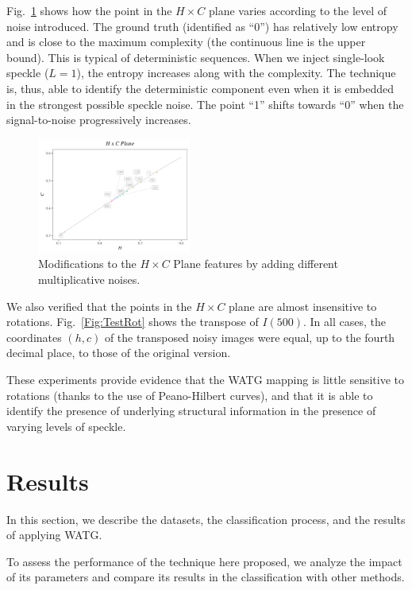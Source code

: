 \documentclass[journal]{IEEEtran}
\begin{document}
Fig.~\ref{Fig:TestSpeckleHC} shows how the point in the $H\times C$ plane varies according to the level of noise introduced.
The ground truth (identified as ``\textsf{0}'') has relatively low entropy and is close to the maximum complexity (the continuous line is the upper bound).
This is typical of deterministic sequences.
When we inject single-look speckle ($L=1$), the entropy increases along with the complexity.
The technique is, thus, able to identify the deterministic component even when it is embedded in the strongest possible speckle noise.
The point ``\textsf{1}'' shifts towards ``\textsf{0}'' when the signal-to-noise progressively increases.

\begin{figure}[hbt]
	\includegraphics[width=0.45\textwidth]{Figures/waves1.pdf}
	\caption{Modifications to the $H \times C$ Plane features by adding different multiplicative noises.}
	\label{Fig:TestSpeckleHC}
\end{figure}

We also verified that the points in the $H\times C$ plane are almost insensitive to rotations.
Fig.~\ref{Fig:TestRot} shows the transpose of $I(500)$.
In all cases, the coordinates $(h,c)$ of the transposed noisy images were equal, up to the fourth decimal place, to those of the original version.

These experiments provide evidence that the WATG mapping is little sensitive to rotations (thanks to the use of Peano-Hilbert curves), and that it is able to identify the presence of underlying structural information in the presence of varying levels of speckle.

\section{Results}\label{Results}

In this section, we describe the datasets, 
the classification process, and 
the results of applying WATG.

To assess the performance of the technique here proposed, we analyze the impact of its parameters and compare its results in the classification with other methods.
\end{document}
